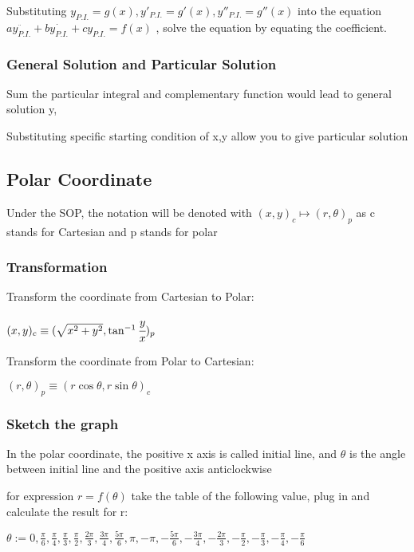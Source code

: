 \documentclass[]{article}
\begin{document}
Substituting \(y_{P.I.} = g(x),y'_{P.I.} = g'(x),y''_{P.I.} = g''(x)\)
into the equation
\(a\ddot{y_{P.I.}} + b\dot{y_{P.I.}} + cy_{P.I.} = f(x)\) , solve the
equation by equating the coefficient.

\subsubsection{General Solution and Particular
Solution}\label{header-n958}

Sum the particular integral and complementary function would lead to
general solution y,

Substituting specific starting condition of x,y allow you to give
particular solution

\subsection{Polar Coordinate}\label{header-n963}

Under the SOP, the notation will be denoted with
\((x,y)_{c} \longmapsto(r,\theta)_{p}\) as c stands for Cartesian and p
stands for polar

\subsubsection{Transformation}\label{header-n966}

Transform the coordinate from Cartesian to Polar:

\((x,y)_{c} \equiv (\sqrt{x^2 + y^2},\tan^{-1} \cfrac{y}{x})_{p}\)

Transform the coordinate from Polar to Cartesian:

\((r,\theta)_{p} \equiv (r\cos \theta, r\sin \theta)_{c}\)

\subsubsection{Sketch the graph}\label{header-n975}

In the polar coordinate, the positive x axis is called initial line, and
\(\theta\) is the angle between initial line and the positive axis
anticlockwise

for expression \(r = f(\theta)\) take the table of the following value,
plug in and calculate the result for r:

\(\theta :=  0,\frac{\pi}{6},\frac{\pi}{4},\frac{\pi}{3},\frac{\pi}{2},\frac{2\pi}{3},\frac{3\pi}{4},\frac{5\pi}{6},\pi,-\pi,-\frac{5\pi}{6},-\frac{3\pi}{4},-\frac{2\pi}{3},-\frac{\pi}{2},-\frac{\pi}{3},-\frac{\pi}{4},-\frac{\pi}{6}\)
\end{document}
